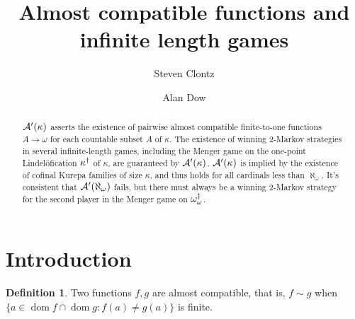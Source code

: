 \documentclass{amsart}
\theoremstyle{plain}
\theoremstyle{definition}
\newtheorem{definition}[theorem]{Definition}
\theoremstyle{remark}
\theoremstyle{plain}
\theoremstyle{definition}
\theoremstyle{remark}
\def\dom{\mathop{dom}}
\begin{document}
\title{Almost compatible functions and infinite length games}




\author{Steven Clontz}
\address{Department of Mathematics and Statistics, UNC Charlotte,
Charlotte, NC 28262}
\author{Alan Dow}
\address{Department of Mathematics and Statistics, UNC Charlotte,
Charlotte, NC 28262}







\begin{abstract}
  \(\mathcal{A}'(\kappa)\) asserts the existence of pairwise
  almost compatible finite-to-one functions \(A\to\omega\) for each
  countable subset \(A\) of \(\kappa\).
  The existence of winning \(2\)-Markov strategies in
  several infinite-length games, including
  the Menger game on the one-point Lindel\"ofication \(\kappa^\dagger\)
  of \(\kappa\), are guaranteed by \(\mathcal{A}'(\kappa)\). \(\mathcal{A}'(\kappa)\) is
  implied by the existence of cofinal Kurepa families of size \(\kappa\),
  and thus holds for all cardinals less than \(\aleph_\omega\).
  It's consistent that \(\mathcal{A}'(\aleph_\omega)\) fails, but
  there must always be a winning \(2\)-Markov strategy for the second
  player in the Menger game on \(\omega_\omega^\dagger\).
\end{abstract}


\maketitle






\section{Introduction}

  \begin{definition}
    Two functions \(f,g\) are almost compatible, that is, \(f\sim g\) when
    \(\{a\in\dom f\cap\dom g:f(a)\not=g(a)\}\) is finite.
  \end{definition}
\end{document}
